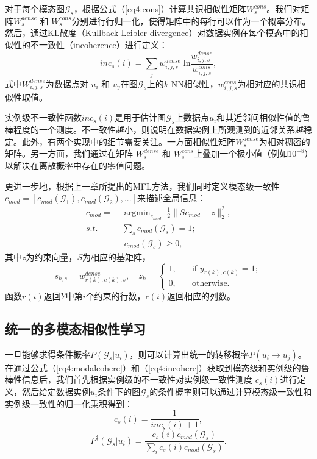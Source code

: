 对于每个模态图$\mathcal{G}_s$，根据公式（\ref{eq4:cons}）计算共识相似性矩阵${W}^{cons}_s$。我们对矩阵${W}_s^{dense}$ 和 ${W}_s^{cons}$分别进行行归一化，使得矩阵中的每行可以作为一个概率分布。然后，通过KL散度（Kullback-Leibler divergence）对数据实例在每个模态中的相似性的不一致性（incoherence）进行定义：
\begin{equation}
inc_s(i) = \sum_j {w}^{dense}_{i,j,s}\;\text{ln}\frac{{w}^{dense}_{i,j,s}}{{w}^{cons}_{i,j,s}}, 
\label{eq4:incohere}
\end{equation}
式中${W}^{dense}_{i,j,s}$为数据点对 $u_i$ 和 $u_j$在图$\mathcal{G}_s$上的$k$-NN相似性，${w}^{cons}_{i,j,s}$为相对应的共识相似性取值。

实例级不一致性函数$inc_s(i)$是用于估计图$\mathcal{G}_s$上数据点$u_i$和其近邻间相似性值的鲁棒程度的一个测度。不一致性越小，则说明在数据实例上所观测到的近邻关系越稳定。此外，有两个实现中的细节需要关注。一方面相似性矩阵${W}^{dense}_s$为相对稠密的矩阵。另一方面，我们通过在矩阵 ${W}_s^{dense}$ 和 ${W}_s^{cons}$上叠加一个极小值（例如$10^{-8}$）以解决在离散概率中存在的零值问题。

更进一步地，根据上一章所提出的MFL方法，我们同时定义模态级一致性$ {c}_{mod} = [c_{mod}(\mathcal{G}_1), c_{mod}(\mathcal{G}_2),...] $来描述全局信息：
\begin{equation}
\begin{split}
{c}_{mod} = \;&\mathop{\mathrm{argmin}}_{{c}_{mod}}\; \frac{1}{2}\|{S}{c}_{mod} - {z}  \|_2^2, \\
s.t.\quad&\sum_{s} c_{mod}(\mathcal{G}_s) = 1;\\ &\; c_{mod}(\mathcal{G}_s) \ge 0,
\end{split}
\label{eq4:modalcohere}
\end{equation}
其中$z$为约束向量，$S$为相应的基矩阵， 
\begin{equation}
{s}_{k,s} =  {w}^{dense}_{r(k), c(k), s}, \quad  {z}_k = \begin{cases}1,\quad &\text{if }  {y}_{r(k),c(k)} =1; \\
0, \quad &\text{otherwise}.
\end{cases}
\end{equation}
函数$ r(i) $返回$Y$中第$i$个约束的行数，$ c(i) $返回相应的列数。

\subsection{统一的多模态相似性学习}
一旦能够求得条件概率$P(\mathcal{G}_s|u_i)$，则可以计算出统一的转移概率$ P(u_i\rightarrow u_j) $。在通过公式（\ref{eq4:modalcohere}）和（\ref{eq4:incohere}）获取到模态级和实例级的鲁棒性信息后，我们首先根据实例级的不一致性对实例级一致性测度 $ c_s(i) $进行定义，然后给定数据实例$u_i$条件下的图$\mathcal{G}_s$的条件概率则可以通过计算模态级一致性和实例级一致性的归一化乘积得到：
\begin{equation}
c_s(i) = \frac{1}{inc_s(i)+1}
\label{eq4:cohere},
\end{equation}
\begin{equation}
P^\dagger (\mathcal{G}_s|u_i) = \frac{c_s(i) c_{mod}(\mathcal{G}_s)}{\sum_i c_s(i) c_{mod}(\mathcal{G}_s)}
\label{eq4:Pglu}.
\end{equation}

